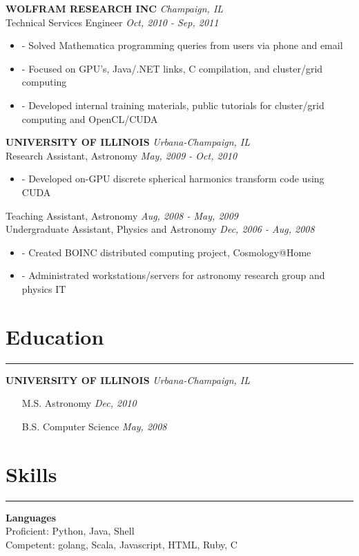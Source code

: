 \documentclass[a4paper,11pt]{article}
\newenvironment{pitemize}{
\begin{itemize}
\setlength{\itemsep}{.01in}
\setlength{\parskip}{.01in}
}
{\end{itemize}}
\begin{document}
\vspace{0.2in}
\textbf{WOLFRAM RESEARCH INC} \hfill \textit{Champaign, IL} \\
Technical Services Engineer \hfill \textit{Oct, 2010 - Sep, 2011}
\begin{pitemize}
\item[-]Solved Mathematica programming queries from users via phone and email
\item[-]Focused on GPU's, Java/.NET links, C compilation, and cluster/grid computing
\item[-]Developed internal training materials, public tutorials for cluster/grid computing and OpenCL/CUDA
\end{pitemize}

\vspace{0.2in}
\textbf{UNIVERSITY OF ILLINOIS} \hfill \textit{Urbana-Champaign, IL} \\
Research Assistant, Astronomy \hfill \textit{May, 2009 - Oct, 2010}
\begin{pitemize}
\item[-]Developed on-GPU discrete spherical harmonics transform code using CUDA
\end{pitemize}
Teaching Assistant, Astronomy \hfill \textit{Aug, 2008 - May, 2009} \\
Undergraduate Assistant, Physics and Astronomy \hfill \textit{Dec, 2006 - Aug, 2008}
\begin{pitemize}
\item[-]Created BOINC distributed computing project, Cosmology@Home
\item[-]Administrated workstations/servers for astronomy research group and physics IT
\end{pitemize}


\section*{\huge{Education}}
\hrule
\vspace{0.1in}
\textbf{UNIVERSITY OF ILLINOIS} \hfill \textit{Urbana-Champaign, IL}
\begin{itemize}
\setlength{\itemsep}{0.0in}
\item[]M.S. Astronomy \hfill \textit{Dec, 2010}
\item[]B.S. Computer Science \hfill \textit{May, 2008}
\end{itemize}

\section*{\huge{Skills}}
\hrule
\vspace{0.1in}
\textbf{Languages} \\
Proficient: Python, Java, Shell \\
Competent: golang, Scala, Javascript, HTML, Ruby, C
\end{document}

